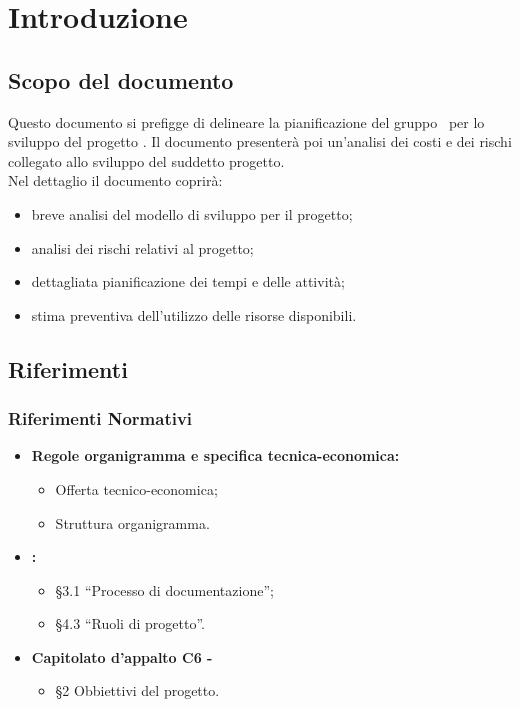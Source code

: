 \documentclass[PianoDiProgetto.tex]{subfiles}
\begin{document}
\chapter{Introduzione}

\section{Scopo del documento}
Questo documento si prefigge di delineare la pianificazione del gruppo \gruppo\ per lo sviluppo del progetto \progetto. Il documento presenterà poi un'analisi dei costi e dei rischi collegato allo sviluppo del suddetto progetto.\\
Nel dettaglio il documento coprirà:
\begin{itemize}
	\item breve analisi del modello di sviluppo per il progetto;
	\item analisi dei rischi relativi al progetto;
	\item dettagliata pianificazione dei tempi e delle attività;
	\item stima preventiva dell'utilizzo delle risorse disponibili.
\end{itemize}

\scopoProdotto

\glossExpl

\section{Riferimenti}
\subsection{Riferimenti Normativi}
\begin{itemize}
	\item \textbf{Regole organigramma e specifica tecnica-economica:} \\
		  \begin{itemize}
		  	\item Offerta tecnico-economica;
		  	\item Struttura organigramma.
		  \end{itemize}
	\item \textbf{\ndp \vruno:}
	 \begin{itemize}
	 	\item \S3.1 ``Processo di documentazione'';
	  	\item \S4.3 ``Ruoli di progetto''.
	 \end{itemize}
 	\item \textbf{Capitolato d'appalto C6 - \progetto}\\
 		\begin{itemize}
 			\item \S2 Obbiettivi del progetto.
 		\end{itemize}
	
\end{itemize}
\end{document}
